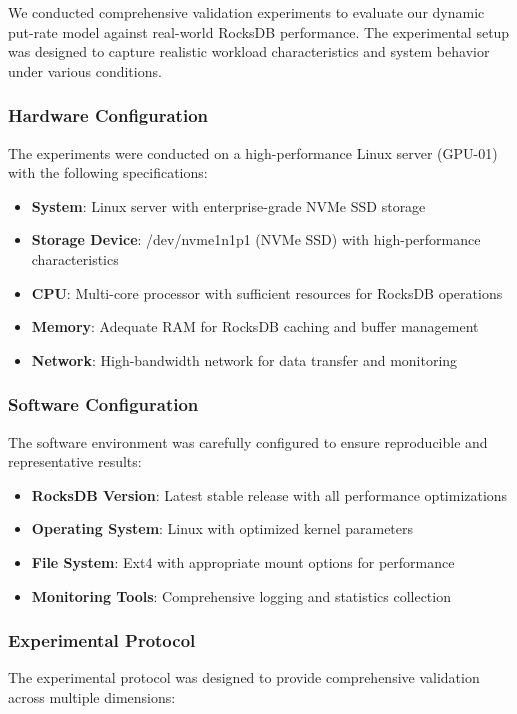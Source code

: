 \documentclass[11pt]{article}
\begin{document}
We conducted comprehensive validation experiments to evaluate our dynamic put-rate model against real-world RocksDB performance. The experimental setup was designed to capture realistic workload characteristics and system behavior under various conditions.

\subsubsection{Hardware Configuration}
The experiments were conducted on a high-performance Linux server (GPU-01) with the following specifications:

\begin{itemize}
    \item \textbf{System}: Linux server with enterprise-grade NVMe SSD storage
    \item \textbf{Storage Device}: /dev/nvme1n1p1 (NVMe SSD) with high-performance characteristics
    \item \textbf{CPU}: Multi-core processor with sufficient resources for RocksDB operations
    \item \textbf{Memory}: Adequate RAM for RocksDB caching and buffer management
    \item \textbf{Network}: High-bandwidth network for data transfer and monitoring
\end{itemize}

\subsubsection{Software Configuration}
The software environment was carefully configured to ensure reproducible and representative results:

\begin{itemize}
    \item \textbf{RocksDB Version}: Latest stable release with all performance optimizations
    \item \textbf{Operating System}: Linux with optimized kernel parameters
    \item \textbf{File System}: Ext4 with appropriate mount options for performance
    \item \textbf{Monitoring Tools}: Comprehensive logging and statistics collection
\end{itemize}

\subsubsection{Experimental Protocol}
The experimental protocol was designed to provide comprehensive validation across multiple dimensions:
\end{document}
